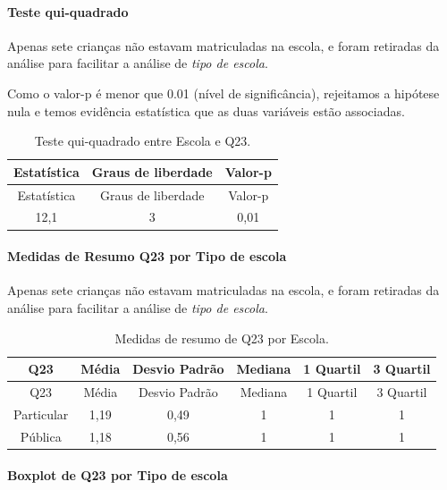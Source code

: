 \documentclass[]{article}
\let\oldparagraph\paragraph
\renewcommand{\paragraph}[1]{\oldparagraph{#1}\mbox{}}
\begin{document}
\hypertarget{teste-qui-quadrado-51}{%
\paragraph{Teste qui-quadrado}\label{teste-qui-quadrado-51}}

Apenas sete crianças não estavam matriculadas na escola, e foram retiradas da análise para facilitar a análise de \emph{tipo de escola}.

Como o valor-p é menor que 0.01 (nível de significância), rejeitamos a hipótese nula e temos evidência estatística que as duas variáveis estão associadas.

\begin{longtable}[]{@{}ccc@{}}
\caption{\label{tab:unnamed-chunk-587}Teste qui-quadrado entre Escola e Q23.}\tabularnewline
\toprule
Estatística & Graus de liberdade & Valor-p\tabularnewline
\midrule
\endfirsthead
\toprule
Estatística & Graus de liberdade & Valor-p\tabularnewline
\midrule
\endhead
12,1 & 3 & 0,01\tabularnewline
\bottomrule
\end{longtable}

\cleardoublepage

\hypertarget{medidas-de-resumo-q23-por-tipo-de-escola}{%
\paragraph{Medidas de Resumo Q23 por Tipo de escola}\label{medidas-de-resumo-q23-por-tipo-de-escola}}

Apenas sete crianças não estavam matriculadas na escola, e foram retiradas da análise para facilitar a análise de \emph{tipo de escola}.

\begin{longtable}[]{@{}cccccc@{}}
\caption{\label{tab:unnamed-chunk-588}Medidas de resumo de Q23 por Escola.}\tabularnewline
\toprule
Q23 & Média & Desvio Padrão & Mediana & 1 Quartil & 3 Quartil\tabularnewline
\midrule
\endfirsthead
\toprule
Q23 & Média & Desvio Padrão & Mediana & 1 Quartil & 3 Quartil\tabularnewline
\midrule
\endhead
Particular & 1,19 & 0,49 & 1 & 1 & 1\tabularnewline
Pública & 1,18 & 0,56 & 1 & 1 & 1\tabularnewline
\bottomrule
\end{longtable}

\hypertarget{boxplot-de-q23-por-tipo-de-escola}{%
\paragraph{Boxplot de Q23 por Tipo de escola}\label{boxplot-de-q23-por-tipo-de-escola}}
\end{document}
